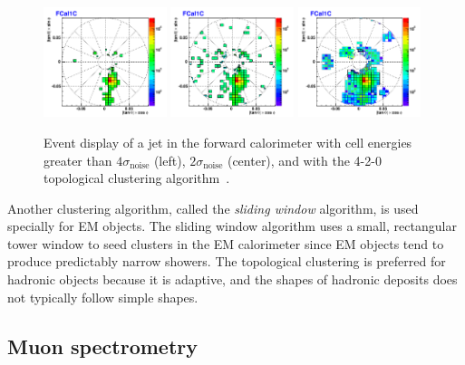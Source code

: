 \begin{figure}[tp]
  \centering
  \includegraphics[width=0.32\textwidth]{figures/lhc-atlas/FCal1C_JF50_28_4sigma}
  \includegraphics[width=0.32\textwidth]{figures/lhc-atlas/FCal1C_JF50_28_2sigma}
  \includegraphics[width=0.32\textwidth]{figures/lhc-atlas/FCal1C_JF50_28}
  \caption{Event display of a jet in the forward calorimeter with cell energies greater than $4\sigma_\text{noise}$ (left), $2\sigma_\text{noise}$ (center), and with the \textsc{4-2-0} topological clustering algorithm~\cite{ATL-SLIDE-2007-027}.}
  \label{fig:atlas-detector-clustering}
\end{figure}

Another clustering algorithm, called the \textit{sliding window} algorithm, is used specially for EM objects. The sliding window algorithm uses a small, rectangular tower window to seed clusters in the EM calorimeter since EM objects tend to produce predictably narrow showers. The topological clustering is preferred for hadronic objects because it is adaptive, and the shapes of hadronic deposits does not typically follow simple shapes.

\subsection{Muon spectrometry}

